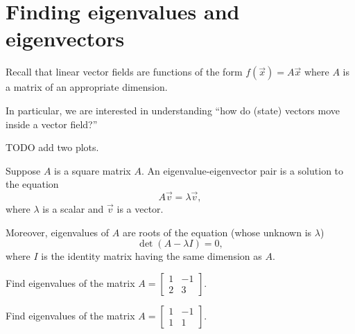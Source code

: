 \documentclass[../main.tex]{subfiles}
\begin{document}
 \section{Finding eigenvalues and eigenvectors}

Recall that linear vector fields are functions of the form \(f(\vec{x}) = A\vec{x}\) where \(A\) is a matrix of an appropriate dimension.  

In particular, we are interested in understanding ``how do (state) vectors move inside a vector field?''

TODO add two plots.

\begin{definition}
  Suppose \(A\) is a square matrix \(A\). An eigenvalue-eigenvector pair is a solution to the equation
  \[
    A \vec{v} = \lambda \vec{v},
  \]
  where \(\lambda\) is a scalar and \(\vec{v}\) is a  vector. 

  Moreover, eigenvalues of \(A\) are roots of the equation (whose unknown is \(\lambda\))
  \[
    \det( A - \lambda I ) = 0,
  \]
  where \(I\) is the identity matrix having the same dimension as \(A\).
\end{definition}

\begin{example}
  Find eigenvalues of the matrix 
  \(
    A = \begin{bmatrix}
      1 & -1 \\
      2 & 3
    \end{bmatrix}
  \).
\end{example}

\begin{example}
  Find eigenvalues of the matrix 
  \(
    A = \begin{bmatrix}
      1 & -1 \\
      1 & 1
    \end{bmatrix}
  \).
\end{example}
\end{document}
